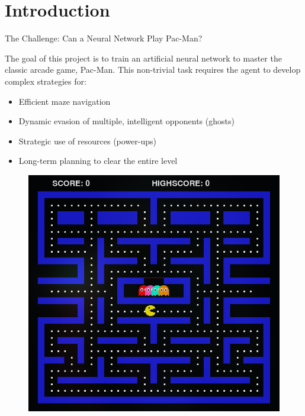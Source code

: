 \section{Introduction}

\begin{frame}{The Challenge: Can a Neural Network Play Pac-Man?}

	The goal of this project is to train an artificial neural network to master the classic arcade game, Pac-Man.
	This non-trivial task requires the agent to develop complex strategies for:

	\begin{minipage}{0.55\textwidth}

		\vspace{0.5em}
		
		\begin{itemize}
			\item Efficient maze navigation
			\item Dynamic evasion of multiple, intelligent opponents (ghosts)
			\item Strategic use of resources (power-ups)
			\item Long-term planning to clear the entire level
		\end{itemize}
		
		\vspace{1em}
	\end{minipage}%
	\hfill
	\begin{minipage}{0.45\textwidth}
		\centering

		\vspace{-0.5em}

		\begin{figure}
			\centering
			\includegraphics[width=0.82\linewidth]{assets/maze.png} %
			

\end{figure}
\end{minipage}
\end{frame}
